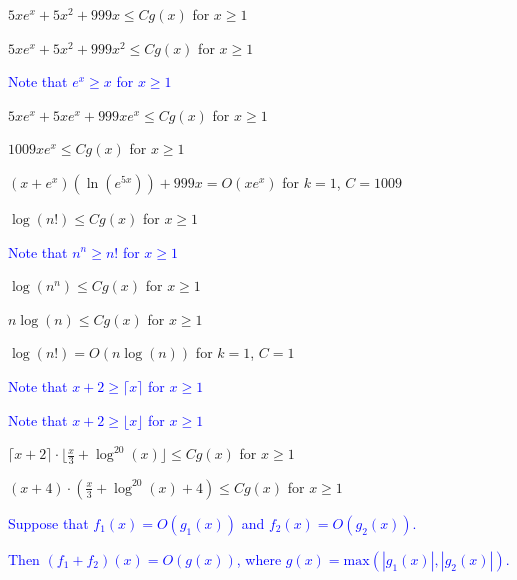 \documentclass{exam}
\begin{document}
\begin{questions}
\begin{subparts}
\begin{center}
\( 5xe^x + 5x^2 + 999x \leq Cg(x) \) for \(x \geq 1\)

\( 5xe^x + 5x^2 + 999x^2 \leq Cg(x) \) for \(x \geq 1\)
\vspace{5px}

\textcolor{blue}{Note that \(e^x \geq x\) for \(x \geq 1\)}
\vspace{5px}

\( 5xe^x + 5xe^x + 999xe^x \leq Cg(x) \) for \(x \geq 1\)

\( 1009xe^x \leq Cg(x) \) for \(x \geq 1\)

\( (x + e^x)(\ln(e^{5x})) + 999x = O(xe^x)\) for \(k = 1\), \(C = 1009\)
\end{center}


\begin{center}

\(\log(n!) \leq Cg(x)\) for \(x \geq 1\)
\vspace{5px}

\textcolor{blue}{Note that \(n^n \geq n!\) for \(x \geq 1\)}
\vspace{5px}

\(\log(n^n) \leq Cg(x)\) for \(x \geq 1\)

\(n\log(n) \leq Cg(x)\) for \(x \geq 1\)

\(\log(n!) = O(n\log(n))\) for \(k = 1\), \(C = 1\)

\end{center}

\newpage


\begin{center}
\textcolor{blue}{Note that \( x+2 \geq \lceil x \rceil\) for \(x \geq 1\)}

\textcolor{blue}{Note that \( x+2 \geq \lfloor x \rfloor\) for \(x \geq 1\)}
\vspace{5px}

\( \lceil x + 2 \rceil \cdot \lfloor \frac{x}{3} + \log^{20}(x) \rfloor \leq Cg(x)\) for \(x \geq 1\)

\( (x + 4) \cdot (\frac{x}{3} + \log^{20}(x) + 4) \leq Cg(x)\) for \(x \geq 1\)

\vspace{5px}
\textcolor{blue}{Suppose that \(f_1(x) = O(g_1(x))\) and \(f_2(x) = O(g_2(x))\).}

\textcolor{blue}{Then \((f_1 + f_2)(x) = O(g(x))\), where \(g(x) = \text{max}(|g_1(x)|, |g_2(x)|)\).}
\vspace{5px}


\end{center}
\end{subparts}
\end{questions}
\end{document}
